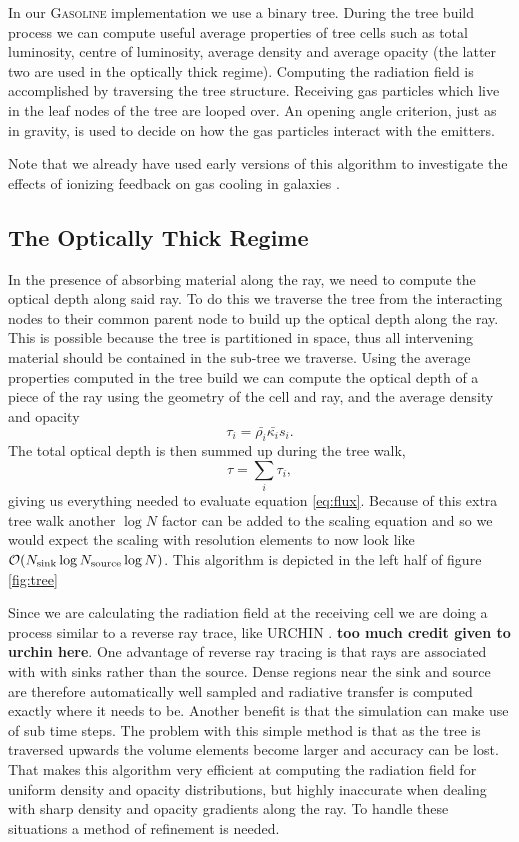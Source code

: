 \documentclass[fleqn,usenatbib]{mnras}
\begin{document}
In our \textsc{Gasoline} implementation we use a binary tree. During the tree 
build process we can compute useful average properties of tree cells such as 
total luminosity, centre of luminosity, average density and average opacity 
(the latter two are used in the optically thick regime). Computing the 
radiation field is accomplished by traversing the tree structure. Receiving gas
 particles which live in the leaf nodes of the tree are looped over. An opening
 angle criterion, just as in gravity, is used to decide on how the gas 
particles interact with the emitters.

Note that we already have used early versions of this algorithm to
 investigate the effects of ionizing feedback on gas cooling in galaxies
\citep{kannanEt14}.

\subsection{The Optically Thick Regime}
In the presence of absorbing material along the ray, we need to compute the 
optical depth along said ray. To do this we traverse the tree from the 
interacting nodes to their common parent node to build up the optical depth 
along the ray. This is possible because the tree is partitioned in space, thus
all intervening material should be contained in the sub-tree we traverse. Using
the average properties computed in the tree build we can compute the optical 
depth of a piece of the ray using the geometry of the cell and ray, and the 
average density and opacity
\begin{equation}
\label{eq:taui}
\tau_i = \bar{\rho_i} \bar{\kappa_i} s_i.
\end{equation}
The total optical depth is then summed up during the tree walk,
\begin{equation}
\label{eq:tausum}
\tau = \sum_i \tau_i,
\end{equation}
giving us everything needed to evaluate equation \ref{eq:flux}. Because of this
 extra tree walk another $\log N$ factor can be added to the scaling equation 
and so we would expect the scaling with resolution elements to now look like
$\mathcal{O} (N_{\rm sink} \log N_{\rm source} \log N)$. This algorithm is 
depicted in the left half of figure \ref{fig:tree}

Since we are calculating the radiation field at the receiving cell we are doing
 a process similar to a reverse ray trace, like URCHIN \citep{altayTheuns13}. 
{\bf too much credit given to urchin here}.
One advantage of reverse ray tracing is that rays are associated with with 
sinks rather than the source. Dense regions near the sink and source are 
therefore automatically well sampled and radiative transfer is computed 
exactly where it needs to be. Another benefit is that the simulation can make 
use of sub time steps. The problem with this simple method is that as the 
tree is traversed upwards the volume elements become larger and accuracy can be
 lost. That makes this algorithm very efficient at computing the radiation 
field for uniform density and opacity distributions, but highly inaccurate when
 dealing with sharp density and opacity gradients along the ray. To handle 
these situations a method of refinement is needed.
\end{document}
